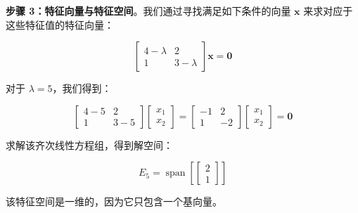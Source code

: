 \begin{notebox}
\textbf{步骤 3：特征向量与特征空间}。我们通过寻找满足如下条件的向量 $ \boldsymbol{x} $ 来求对应于这些特征值的特征向量：

\begin{equation}
\begin{bmatrix} 4 - \lambda & 2 \\ 1 & 3 - \lambda \end{bmatrix} \boldsymbol{x} = \boldsymbol{0}
\tag{4.31}\label{eq:4-31}
\end{equation}

对于 $ \lambda = 5 $，我们得到：

\begin{equation}
\begin{bmatrix} 4 - 5 & 2 \\ 1 & 3 - 5 \end{bmatrix} \begin{bmatrix} x_1 \\ x_2 \end{bmatrix} = \begin{bmatrix} -1 & 2 \\ 1 & -2 \end{bmatrix} \begin{bmatrix} x_1 \\ x_2 \end{bmatrix} = \boldsymbol{0}
\tag{4.32}\label{eq:4-32}
\end{equation}

求解该齐次线性方程组，得到解空间：

\begin{equation}
E_5 = \operatorname{span}\left[\begin{bmatrix} 2 \\ 1 \end{bmatrix}\right]
\tag{4.33}\label{eq:4-33}
\end{equation}

该特征空间是一维的，因为它只包含一个基向量。
\end{notebox}

